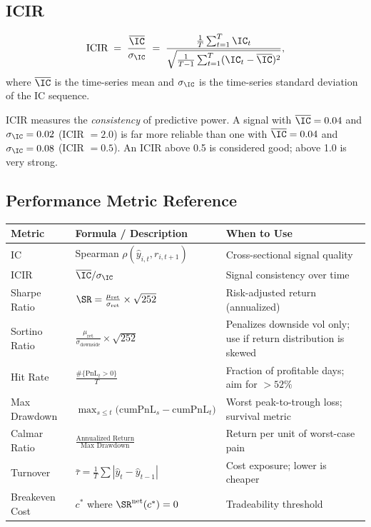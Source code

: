 \subsection{ICIR}

\begin{definition}
\begin{equation}
\label{eq:icir}
\text{ICIR} \;=\; \frac{\overline{\IC}}{\sigma_{\IC}} \;=\; \frac{\frac{1}{T}\sum_{t=1}^T \IC_t}{\sqrt{\frac{1}{T-1}\sum_{t=1}^T (\IC_t - \overline{\IC})^2}},
\end{equation}
where $\overline{\IC}$ is the time-series mean and $\sigma_{\IC}$ is the time-series standard deviation of the IC sequence.
\end{definition}

ICIR measures the \emph{consistency} of predictive power.  A signal with $\overline{\IC} = 0.04$ and $\sigma_{\IC} = 0.02$ (ICIR $= 2.0$) is far more reliable than one with $\overline{\IC} = 0.04$ and $\sigma_{\IC} = 0.08$ (ICIR $= 0.5$).  An ICIR above 0.5 is considered good; above 1.0 is very strong.

\subsection{Performance Metric Reference}

\begin{center}
\begin{tabular}{p{3.2cm} p{5.8cm} p{4.5cm}}
\toprule
\textbf{Metric} & \textbf{Formula / Description} & \textbf{When to Use} \\
\midrule
IC & Spearman $\rho(\hat{y}_{i,t}, r_{i,t+1})$ & Cross-sectional signal quality \\
\addlinespace
ICIR & $\overline{\IC} / \sigma_{\IC}$ & Signal consistency over time \\
\addlinespace
Sharpe Ratio & $\SR = \frac{\mu_{\text{ret}}}{\sigma_{\text{ret}}} \times \sqrt{252}$ & Risk-adjusted return (annualized) \\
\addlinespace
Sortino Ratio & $\frac{\mu_{\text{ret}}}{\sigma_{\text{downside}}} \times \sqrt{252}$ & Penalizes downside vol only; use if return distribution is skewed \\
\addlinespace
Hit Rate & $\frac{\#\{\text{PnL}_t > 0\}}{T}$ & Fraction of profitable days; aim for $>52\%$ \\
\addlinespace
Max Drawdown & $\max_{s \leq t} \bigl(\text{cumPnL}_s - \text{cumPnL}_t\bigr)$ & Worst peak-to-trough loss; survival metric \\
\addlinespace
Calmar Ratio & $\frac{\text{Annualized Return}}{\text{Max Drawdown}}$ & Return per unit of worst-case pain \\
\addlinespace
Turnover & $\bar{\tau} = \frac{1}{T}\sum |\hat{y}_t - \hat{y}_{t-1}|$ & Cost exposure; lower is cheaper \\
\addlinespace
Breakeven Cost & $c^*$ where $\SR^{\text{net}}(c^*) = 0$ & Tradeability threshold \\
\bottomrule
\end{tabular}
\end{center}

